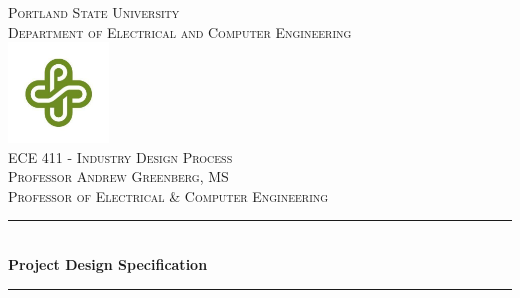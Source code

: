 \documentclass[11pt]{article}
\begin{document}

\begin{titlepage} %
	\newcommand{\HRule}{\rule{\linewidth}{0.5mm}} %
	
	\center %
	
	
	\textsc{\LARGE Portland State University
}\\[.25cm] %
	
	\textsc{\Large Department of Electrical and Computer Engineering }\\[.5cm] %
\includegraphics[width=0.2\textwidth]{images/psuLOGO}\\[.5cm]
	\textsc{\LARGE ECE 411 - Industry Design Process }\\[0.75cm] %
	
		\textsc{\Large Professor Andrew Greenberg, MS\\
Professor of Electrical \& Computer Engineering
 }\\[.75cm]
	
	
	\HRule\\[0.4cm]
	
	{\huge\bfseries Project Design Specification}\\[0.4cm] %
	
	\HRule\\[1.5cm]
	
	

\end{titlepage}
\end{document}
